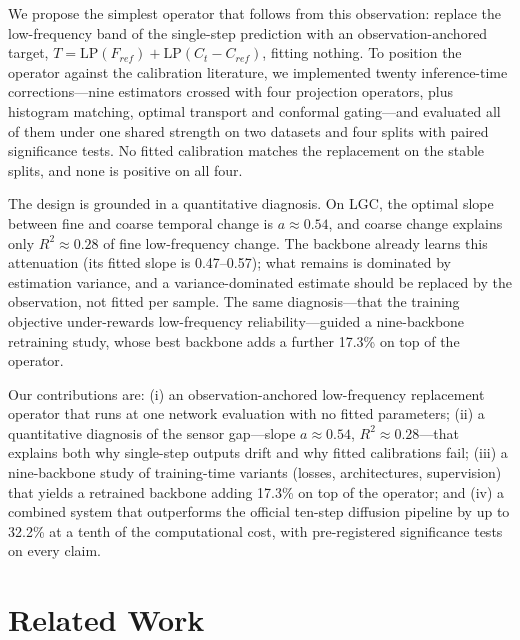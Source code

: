 \documentclass{article}
\begin{document}
We propose the simplest operator that follows from this observation: replace the low-frequency band of the single-step prediction with an observation-anchored target, $T=\mathrm{LP}(F_{ref})+\mathrm{LP}(C_t-C_{ref})$, fitting nothing. To position the operator against the calibration literature, we implemented twenty inference-time corrections---nine estimators crossed with four projection operators, plus histogram matching, optimal transport and conformal gating---and evaluated all of them under one shared strength on two datasets and four splits with paired significance tests. No fitted calibration matches the replacement on the stable splits, and none is positive on all four.

The design is grounded in a quantitative diagnosis. On LGC, the optimal slope between fine and coarse temporal change is $a\approx0.54$, and coarse change explains only $R^2\approx0.28$ of fine low-frequency change. The backbone already learns this attenuation (its fitted slope is 0.47--0.57); what remains is dominated by estimation variance, and a variance-dominated estimate should be replaced by the observation, not fitted per sample. The same diagnosis---that the training objective under-rewards low-frequency reliability---guided a nine-backbone retraining study, whose best backbone adds a further 17.3\% on top of the operator.

Our contributions are: (i) an observation-anchored low-frequency replacement operator that runs at one network evaluation with no fitted parameters; (ii) a quantitative diagnosis of the sensor gap---slope $a\approx0.54$, $R^2\approx0.28$---that explains both why single-step outputs drift and why fitted calibrations fail; (iii) a nine-backbone study of training-time variants (losses, architectures, supervision) that yields a retrained backbone adding 17.3\% on top of the operator; and (iv) a combined system that outperforms the official ten-step diffusion pipeline by up to 32.2\% at a tenth of the computational cost, with pre-registered significance tests on every claim.

\section{Related Work}
\label{sec:related}
\end{document}
